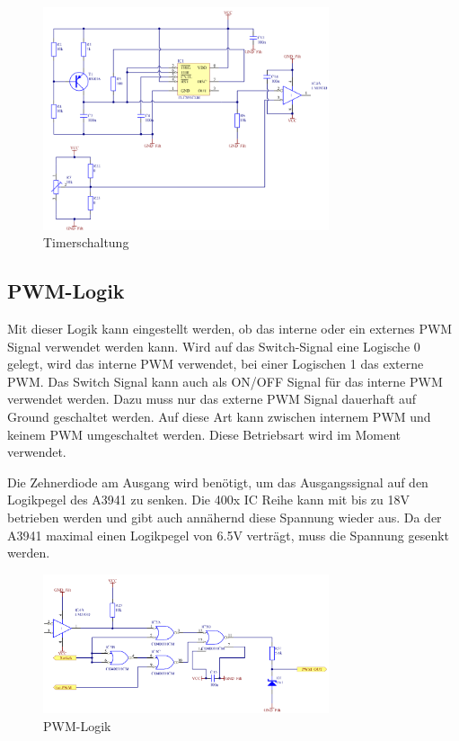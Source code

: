 \begin{figure}[h!]
	\centering
	\includegraphics[width=0.75\textwidth]{src/dc/fig/timer_schematic.png}
	\caption{Timerschaltung}
\end{figure}

\newpage
\subsection{PWM-Logik}
Mit dieser Logik kann eingestellt werden, ob das interne oder ein externes
PWM Signal verwendet werden kann. Wird auf das Switch-Signal eine Logische
0 gelegt, wird das interne PWM verwendet, bei einer Logischen 1 das externe
PWM. Das Switch Signal kann auch als ON/OFF Signal für das interne PWM
verwendet werden. Dazu muss nur das externe PWM Signal dauerhaft auf Ground
geschaltet werden. Auf diese Art kann zwischen internem PWM und keinem PWM
umgeschaltet werden. Diese Betriebsart wird im Moment verwendet.

Die Zehnerdiode am Ausgang wird benötigt, um das Ausgangssignal auf den
Logikpegel des A3941 zu senken. Die 400x IC Reihe kann mit bis zu 18V
betrieben werden und gibt auch annähernd diese Spannung wieder aus. Da der
A3941 maximal einen Logikpegel von 6.5V verträgt, muss die Spannung
gesenkt werden.

\begin{figure}[h!]
	\centering
	\includegraphics[width=0.75\textwidth]{src/dc/fig/pwm_schematic.png}
	\caption{PWM-Logik}
\end{figure}

